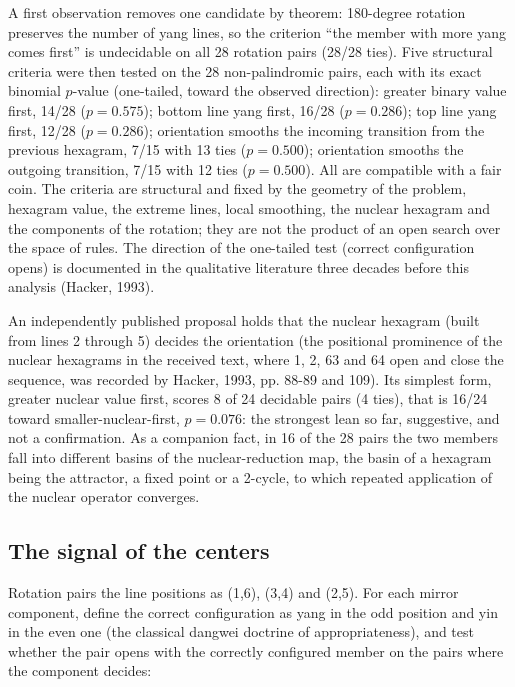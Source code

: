 \documentclass[11pt]{article}
\begin{document}
A first observation removes one candidate by theorem: 180-degree rotation preserves the number of yang lines, so the criterion ``the member with more yang comes first'' is undecidable on all 28 rotation pairs (28/28 ties). Five structural criteria were then tested on the 28 non-palindromic pairs, each with its exact binomial $p$-value (one-tailed, toward the observed direction): greater binary value first, 14/28 ($p = 0.575$); bottom line yang first, 16/28 ($p = 0.286$); top line yang first, 12/28 ($p = 0.286$); orientation smooths the incoming transition from the previous hexagram, 7/15 with 13 ties ($p = 0.500$); orientation smooths the outgoing transition, 7/15 with 12 ties ($p = 0.500$). All are compatible with a fair coin. The criteria are structural and fixed by the geometry of the problem, hexagram value, the extreme lines, local smoothing, the nuclear hexagram and the components of the rotation; they are not the product of an open search over the space of rules. The direction of the one-tailed test (correct configuration opens) is documented in the qualitative literature three decades before this analysis (Hacker, 1993).

An independently published proposal holds that the nuclear hexagram (built from lines 2 through 5) decides the orientation (the positional prominence of the nuclear hexagrams in the received text, where 1, 2, 63 and 64 open and close the sequence, was recorded by Hacker, 1993, pp. 88-89 and 109). Its simplest form, greater nuclear value first, scores 8 of 24 decidable pairs (4 ties), that is 16/24 toward smaller-nuclear-first, $p = 0.076$: the strongest lean so far, suggestive, and not a confirmation. As a companion fact, in 16 of the 28 pairs the two members fall into different basins of the nuclear-reduction map, the basin of a hexagram being the attractor, a fixed point or a 2-cycle, to which repeated application of the nuclear operator converges.

\subsection{The signal of the centers}
\label{sec:centers}

Rotation pairs the line positions as (1,6), (3,4) and (2,5). For each mirror component, define the correct configuration as yang in the odd position and yin in the even one (the classical dangwei doctrine of appropriateness), and test whether the pair opens with the correctly configured member on the pairs where the component decides:
\end{document}
